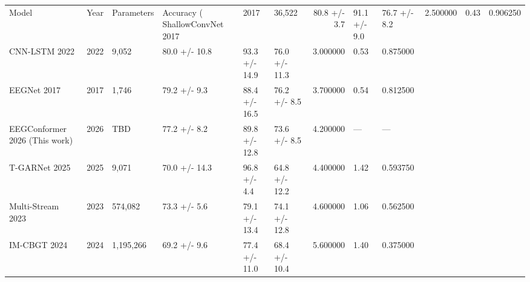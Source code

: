 \begin{tabular}{lrllllrll}
\toprule
Model & Year & Parameters & Accuracy (%
\midrule
ShallowConvNet 2017 & 2017 & 36,522 & 80.8 +/- 3.7 & 91.1 +/- 9.0 & 76.7 +/- 8.2 & 2.500000 & 0.43 & 0.906250 \\
CNN-LSTM 2022 & 2022 & 9,052 & 80.0 +/- 10.8 & 93.3 +/- 14.9 & 76.0 +/- 11.3 & 3.000000 & 0.53 & 0.875000 \\
EEGNet 2017 & 2017 & 1,746 & 79.2 +/- 9.3 & 88.4 +/- 16.5 & 76.2 +/- 8.5 & 3.700000 & 0.54 & 0.812500 \\
EEGConformer 2026 (This work) & 2026 & TBD & 77.2 +/- 8.2 & 89.8 +/- 12.8 & 73.6 +/- 8.5 & 4.200000 & — & — \\
T-GARNet 2025 & 2025 & 9,071 & 70.0 +/- 14.3 & 96.8 +/- 4.4 & 64.8 +/- 12.2 & 4.400000 & 1.42 & 0.593750 \\
Multi-Stream 2023 & 2023 & 574,082 & 73.3 +/- 5.6 & 79.1 +/- 13.4 & 74.1 +/- 12.8 & 4.600000 & 1.06 & 0.562500 \\
IM-CBGT 2024 & 2024 & 1,195,266 & 69.2 +/- 9.6 & 77.4 +/- 11.0 & 68.4 +/- 10.4 & 5.600000 & 1.40 & 0.375000 \\
\bottomrule
\end{tabular}
